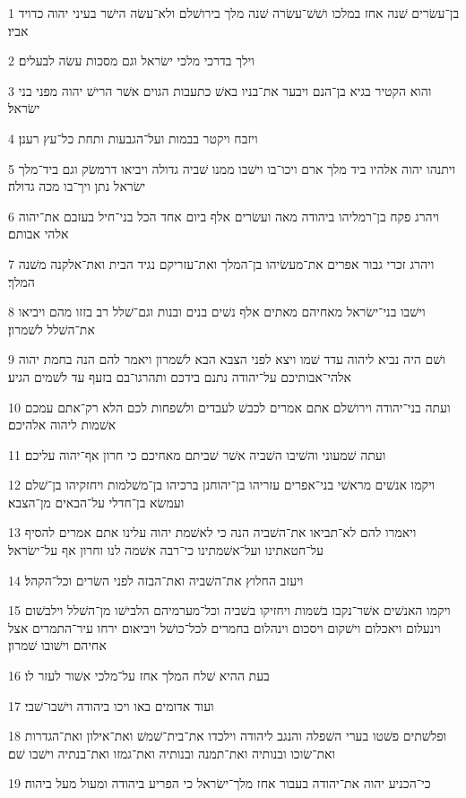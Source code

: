 \par 1 בן־עשׂרים שׁנה אחז במלכו ושׁשׁ־עשׂרה שׁנה מלך בירושׁלם ולא־עשׂה הישׁר בעיני יהוה כדויד אביו׃
\par 2 וילך בדרכי מלכי ישׂראל וגם מסכות עשׂה לבעלים׃
\par 3 והוא הקטיר בגיא בן־הנם ויבער את־בניו באשׁ כתעבות הגוים אשׁר הרישׁ יהוה מפני בני ישׂראל׃
\par 4 ויזבח ויקטר בבמות ועל־הגבעות ותחת כל־עץ רענן׃
\par 5 ויתנהו יהוה אלהיו ביד מלך ארם ויכו־בו וישׁבו ממנו שׁביה גדולה ויביאו דרמשׂק וגם ביד־מלך ישׂראל נתן ויך־בו מכה גדולה׃
\par 6 ויהרג פקח בן־רמליהו ביהודה מאה ועשׂרים אלף ביום אחד הכל בני־חיל בעזבם את־יהוה אלהי אבותם׃
\par 7 ויהרג זכרי גבור אפרים את־מעשׂיהו בן־המלך ואת־עזריקם נגיד הבית ואת־אלקנה משׁנה המלך׃
\par 8 וישׁבו בני־ישׂראל מאחיהם מאתים אלף נשׁים בנים ובנות וגם־שׁלל רב בזזו מהם ויביאו את־השׁלל לשׁמרון׃
\par 9 ושׁם היה נביא ליהוה עדד שׁמו ויצא לפני הצבא הבא לשׁמרון ויאמר להם הנה בחמת יהוה אלהי־אבותיכם על־יהודה נתנם בידכם ותהרגו־בם בזעף עד לשׁמים הגיע׃
\par 10 ועתה בני־יהודה וירושׁלם אתם אמרים לכבשׁ לעבדים ולשׁפחות לכם הלא רק־אתם עמכם אשׁמות ליהוה אלהיכם׃
\par 11 ועתה שׁמעוני והשׁיבו השׁביה אשׁר שׁביתם מאחיכם כי חרון אף־יהוה עליכם׃
\par 12 ויקמו אנשׁים מראשׁי בני־אפרים עזריהו בן־יהוחנן ברכיהו בן־משׁלמות ויחזקיהו בן־שׁלם ועמשׂא בן־חדלי על־הבאים מן־הצבא׃
\par 13 ויאמרו להם לא־תביאו את־השׁביה הנה כי לאשׁמת יהוה עלינו אתם אמרים להסיף על־חטאתינו ועל־אשׁמתינו כי־רבה אשׁמה לנו וחרון אף על־ישׂראל׃
\par 14 ויעזב החלוץ את־השׁביה ואת־הבזה לפני השׂרים וכל־הקהל׃
\par 15 ויקמו האנשׁים אשׁר־נקבו בשׁמות ויחזיקו בשׁביה וכל־מערמיהם הלבישׁו מן־השׁלל וילבשׁום וינעלום ויאכלום וישׁקום ויסכום וינהלום בחמרים לכל־כושׁל ויביאום ירחו עיר־התמרים אצל אחיהם וישׁובו שׁמרון׃
\par 16 בעת ההיא שׁלח המלך אחז על־מלכי אשׁור לעזר לו׃
\par 17 ועוד אדומים באו ויכו ביהודה וישׁבו־שׁבי׃
\par 18 ופלשׁתים פשׁטו בערי השׁפלה והנגב ליהודה וילכדו את־בית־שׁמשׁ ואת־אילון ואת־הגדרות ואת־שׂוכו ובנותיה ואת־תמנה ובנותיה ואת־גמזו ואת־בנתיה וישׁבו שׁם׃
\par 19 כי־הכניע יהוה את־יהודה בעבור אחז מלך־ישׂראל כי הפריע ביהודה ומעול מעל ביהוה׃
